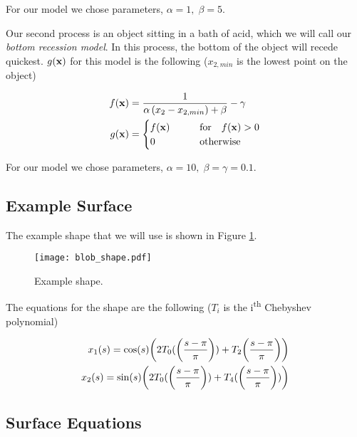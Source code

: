 For our model we chose parameters, $\alpha = 1, \; \beta = 5$.

Our second process is an object sitting in a bath of acid, which we will call our \textit{bottom recession model}. In this process, the bottom of the object will recede quickest. $g(\mathbf{x})$ for this model is the following ($x_{2, min}$ is the lowest point on the object)

\begin{align}
  f(\mathbf{x})& = \frac{1}{\alpha \, (x_2 - x_{2, min}) + \beta} - \gamma\\
  g(\mathbf{x})& = \begin{cases}
    f(\mathbf{x}) \qquad &\text{for} \quad f(\mathbf{x}) > 0\\
    0 \qquad &\text{otherwise}
  \end{cases}
\end{align}

For our model we chose parameters, $\alpha = 10, \; \beta = \gamma = 0.1$.

\subsection*{Example Surface}

The example shape that we will use is shown in Figure \ref{fig:blob-shape}.

\begin{figure}[H]
    \begin{center}
      \texttt{[image: blob\_shape.pdf]}
    \end{center}
  \vspace{-.2in} %
  \caption{\label{fig:blob-shape} Example shape.}
\end{figure}

The equations for the shape are the following ($T_i$ is the i\textsuperscript{th} Chebyshev polynomial)

\begin{align*}
  x_1(s) = \cos(s) \paren{2 T_0(\paren{\frac{s-\pi}{\pi}}) + T_2\paren{\frac{s-\pi}{\pi}}}\\
  x_2(s) = \sin(s) \paren{2 T_0(\paren{\frac{s-\pi}{\pi}}) + T_4(\paren{\frac{s-\pi}{\pi}})}
\end{align*}

\subsection*{Surface Equations}

